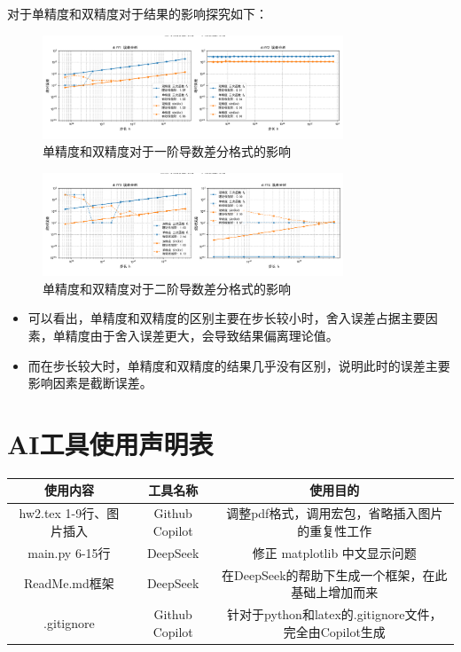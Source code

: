 \documentclass[UTF8]{ctexart}
\begin{document}
对于单精度和双精度对于结果的影响探究如下：
\begin{figure}[H]
    \centering
    \includegraphics[width=0.8\textwidth]{Figure_3.png} 
    \caption{单精度和双精度对于一阶导数差分格式的影响}
\end{figure}
\begin{figure}[H]
    \centering
    \includegraphics[width=0.8\textwidth]{Figure_4.png} 
    \caption{单精度和双精度对于二阶导数差分格式的影响}
\end{figure}

\begin{itemize}
    \item 可以看出，单精度和双精度的区别主要在步长较小时，舍入误差占据主要因素，单精度由于舍入误差更大，会导致结果偏离理论值。
    \item 而在步长较大时，单精度和双精度的结果几乎没有区别，说明此时的误差主要影响因素是截断误差。
\end{itemize}

\newpage
\appendix
\section{AI工具使用声明表}
\begin{table}[H]
    \centering
    \begin{tabular}{c|c|c}
        \hline
        使用内容 & 工具名称 & 使用目的 \\ \hline
        hw2.tex 1-9行、图片插入 & Github Copilot & 调整pdf格式，调用宏包，省略插入图片的重复性工作 \\ 
        main.py 6-15行 & DeepSeek & 修正 matplotlib 中文显示问题 \\ 
        ReadMe.md框架 & DeepSeek & 在DeepSeek的帮助下生成一个框架，在此基础上增加而来 \\
        .gitignore & Github Copilot & 针对于python和latex的.gitignore文件，完全由Copilot生成  
    \end{tabular}
    \label{tab:AI_tools}
\end{table}
\end{document}
